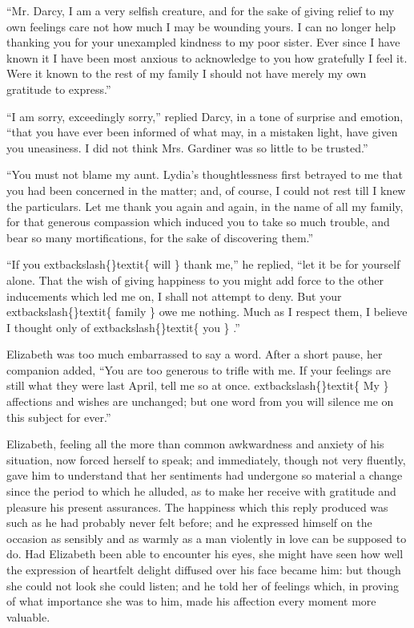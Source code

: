 \documentclass[10pt]{book}
\begin{document}
   “Mr. Darcy, I am a very selfish creature, and for the sake of giving
relief to my own feelings care not how much I may be wounding yours. I
can no longer help thanking you for your unexampled kindness to my poor
sister. Ever since I have known it I have been most anxious to
acknowledge to you how gratefully I feel it. Were it known to the rest
of my family I should not have merely my own gratitude to express.”
  

   “I am sorry, exceedingly sorry,” replied Darcy, in a tone of surprise
and emotion, “that you have ever been informed of what may, in a
mistaken light, have given you uneasiness. I did not think Mrs. Gardiner
was so little to be trusted.”
  

   “You must not blame my aunt. Lydia’s thoughtlessness
   first betrayed to
me that you had been concerned in the matter; and, of course, I could
not rest till I knew the particulars. Let me thank you again and again,
in the name of all my family, for that generous compassion which induced
you to take so much trouble, and bear so many mortifications, for the
sake of discovering them.”
  

   “If you
   	extbackslash\{\}textit\{
    will
   \}
   thank me,” he replied, “let it be for yourself alone.
That the wish of giving happiness to you might add force to the other
inducements which led me on, I shall not attempt to deny. But your
   	extbackslash\{\}textit\{
    family
   \}
   owe me nothing. Much as I respect them, I believe I thought
only of
   	extbackslash\{\}textit\{
    you
   \}
   .”
  

   Elizabeth was too much embarrassed to say a word. After a short pause,
her companion added, “You are too generous to trifle with me. If your
feelings are still what they were last April, tell me so at once.
   	extbackslash\{\}textit\{
    My
   \}
   affections and wishes are unchanged; but one word from you will silence
me on this subject for ever.”
  

   Elizabeth, feeling all the more than common awkwardness and anxiety of
his situation, now forced herself to speak; and immediately, though not
very fluently, gave him to understand that her sentiments had undergone
so material a change since the period to which he alluded, as to make
her receive with gratitude and pleasure his present assurances. The
happiness which this reply produced was such as he had probably never
felt before; and he expressed himself on the occasion as sensibly and as
warmly as a man violently in love can be supposed to do. Had Elizabeth
been able to encounter his eyes, she might have seen how well the
expression of heartfelt delight diffused over his face became him: but
though she could not look she could listen; and he told her of
   feelings
which, in proving of what importance she was to him, made his affection
every moment more valuable.
  
\end{document}
